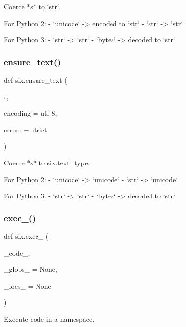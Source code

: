 \begin{DoxyVerb}Coerce *s* to `str`.

For Python 2:
  - `unicode` -> encoded to `str`
  - `str` -> `str`

For Python 3:
  - `str` -> `str`
  - `bytes` -> decoded to `str`
\end{DoxyVerb}
 \mbox{\label{namespacesix_abbbb070dd44999d80cf2dbf469cbee20}} 
\subsubsection{\texorpdfstring{ensure\+\_\+text()}{ensure\_text()}}
{\footnotesize\ttfamily def six.\+ensure\+\_\+text (\begin{DoxyParamCaption}\item[{}]{s,  }\item[{}]{encoding = {\ttfamily \textquotesingle{}utf-\/8\textquotesingle{}},  }\item[{}]{errors = {\ttfamily \textquotesingle{}strict\textquotesingle{}} }\end{DoxyParamCaption})}

\begin{DoxyVerb}Coerce *s* to six.text_type.

For Python 2:
  - `unicode` -> `unicode`
  - `str` -> `unicode`

For Python 3:
  - `str` -> `str`
  - `bytes` -> decoded to `str`
\end{DoxyVerb}
 \mbox{\label{namespacesix_a5151099b4e703601f34a658d42c14100}} 
\subsubsection{\texorpdfstring{exec\+\_\+()}{exec\_()}}
{\footnotesize\ttfamily def six.\+exec\+\_\+ (\begin{DoxyParamCaption}\item[{}]{\+\_\+code\+\_\+,  }\item[{}]{\+\_\+globs\+\_\+ = {\ttfamily None},  }\item[{}]{\+\_\+locs\+\_\+ = {\ttfamily None} }\end{DoxyParamCaption})}

\begin{DoxyVerb}Execute code in a namespace.\end{DoxyVerb}
 \mbox{\label{namespacesix_a7fdefd36b1e0348ef236a3b06cb104c0}} 
